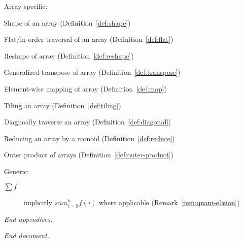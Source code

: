\documentclass{DIKU-report-variant}
\newcommand\mrm[1]{\mathrm{#1}}
\newcommand\brm[1]{\bm{\mrm{#1}}}
\newcommand\reduce{\operatorname*{\brm{reduce}\,}}
\newcommand\diag{\operatorname*{\brm{diag}\,}}
\newcommand\tile{\operatorname*{\brm{tile}\,}}
\newcommand\oprodby[1]{\mathop{\operatorname*{\,\brm{by}}_{#1}}}
\begin{document}
Array specific:
\begin{description}[align=left,labelwidth=7em]
  \item[\(\sharp A\)] Shape of an array (Definition~\ref{def:shape})
  \item[\(\flat A\)] Flat/in-order traversal of an array (Definition~\ref{def:flat})
  \item[\(\varrho(A, \rho)\)] Reshape of array (Definition~\ref{def:reshape})
  \item[\(A \circ \sigma\)] Generalized transpose of array (Definition~\ref{def:transpose})
  \item[\(f \circ A\)] Element-wise mapping of array (Definition~\ref{def:map})
  \item[\(\tile_{\times k, x} A\)] Tiling an array (Definition~\ref{def:tiling})
  \item[\(\diag_{x, y} A\)] Diagnoally traverse an array (Definition~\ref{def:diagonal})
  \item[\(\reduce^k_{(S, \oplus, \epsilon)} A\)] Reducing an array by a monoid (Definition~\ref{def:reduce})
  \item[\(A \oprodby f B\)] Outer product of arrays (Definition~\ref{def:outer-product})
\end{description}

Generic:
\begin{description}
  \item[\(\sum f\)] implicitly \(sum_{i=0}^{k} f(i)\) where applicable (Remark~\ref{rem:quant-elision})
\end{description}

\vfill
\begin{center}\itshape End appendices.\end{center}
\clearpage

{}
\printbibliography

\vfill
\begin{center}\itshape End document.\end{center}
\end{document}
